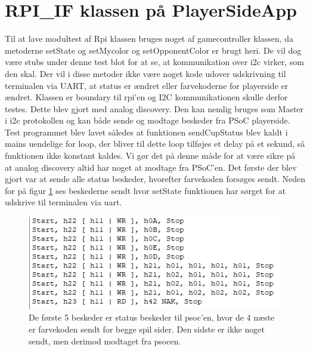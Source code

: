\documentclass[Modultest/Modultest_main.tex]{subfiles}
\begin{document}
\section{RPI\_IF klassen på PlayerSideApp}\label{sec:RPIIFmodultestbilag}
Til at lave modultest af Rpi klassen bruges noget af gamecontroller klassen, da metoderne setState og setMycolor og setOpponentColor er brugt heri. De vil dog være stubs under denne test blot for at se, at kommunikation over i2c virker, som den skal. Der vil i disse metoder ikke være noget kode udover udskrivning til terminalen via UART, at status er ændret eller farvekoderne for playerside er ændret. 
Klassen er boundary til rpi'en og I2C kommunikationen skulle derfor testes. Dette blev gjort med analog discovery. Den kan nemlig bruges som Master i i2c protokollen og kan både sende og modtage beskeder fra PSoC playerside. Test programmet blev lavet således at funktionen sendCupStatus blev kaldt i mains uendelige for loop, der bliver til dette loop tilføjes et delay på et sekund, så funktionen ikke konstant kaldes. Vi gør det på denne måde for at være sikre på at analog discovery altid har noget at modtage fra PSoC'en. Det første der blev gjort var at sende alle status beskeder, hvorefter farvekoden forsøges sendt. Neden for på figur \ref{fig:analog_beskeder} ses beskederne sendt hvor setState funktionen har sørget for at udskrive til terminalen via uart.
\begin{figure}
    \centering 
    \includegraphics[width=\linewidth]{Modultest/RPI_IF/graphic/analog_beskeder.PNG}
    \caption{De første 5 beskeder er status beskeder til psoc'en, hvor de 4 næste er farvekoden sendt for begge spil sider. Den sidste er ikke noget sendt, men derimod modtaget fra psocen.}
    \label{fig:analog_beskeder}
\end{figure}
\end{document}
